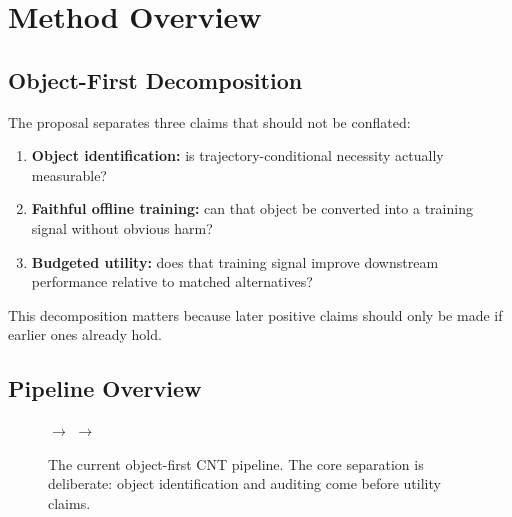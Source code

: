 \section{Method Overview}

\subsection{Object-First Decomposition}

The proposal separates three claims that should not be conflated:

\begin{enumerate}
  \item \textbf{Object identification:} is trajectory-conditional necessity actually measurable?
  \item \textbf{Faithful offline training:} can that object be converted into a training signal without obvious harm?
  \item \textbf{Budgeted utility:} does that training signal improve downstream performance relative to matched alternatives?
\end{enumerate}

This decomposition matters because later positive claims should only be made if earlier ones already hold.

\subsection{Pipeline Overview}

\begin{figure}[t]
  \centering
  \setlength{\fboxsep}{6pt}
  \small
  $\rightarrow$
  $\rightarrow$
  \caption{The current object-first CNT pipeline. The core separation is deliberate: object identification and auditing come before utility claims.}
  \label{fig:pipeline}
\end{figure}

